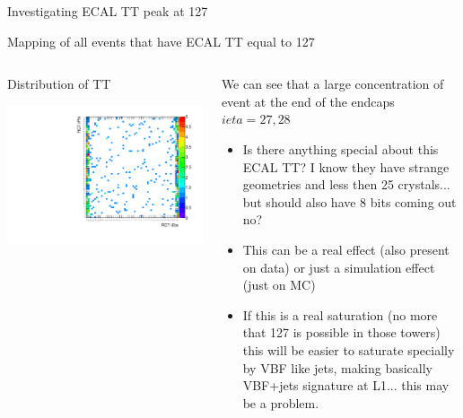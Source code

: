 \documentclass[8pt]{beamer}
\begin{document}
\begin{frame}{Investigating ECAL TT peak at 127}

Mapping of all events that have ECAL TT equal to 127

\begin{columns}
  
\begin{block}{Distribution of TT}
\centering

\includegraphics[width=\linewidth]{fig/ECALTT_CompressedEt127_EtaPhiTotal.pdf}

\end{block}

\begin{block}
\centering

We can see that a large concentration of event at the end of the endcaps $ieta=27,28$
\begin{itemize}
  \item Is there anything special about this ECAL TT? I know they have strange geometries and less then 25 crystals... but should also have 8 bits coming out no?
  \item This can be a real effect (also present on data) or just a simulation effect (just on MC)
  \item If this is a real saturation (no more that 127 is possible in those towers) this will be easier to saturate specially by VBF like jets, making basically VBF+jets signature at L1... this may be a problem.
\end{itemize}

\end{block}

\end{columns}



\end{frame}
\end{document}
